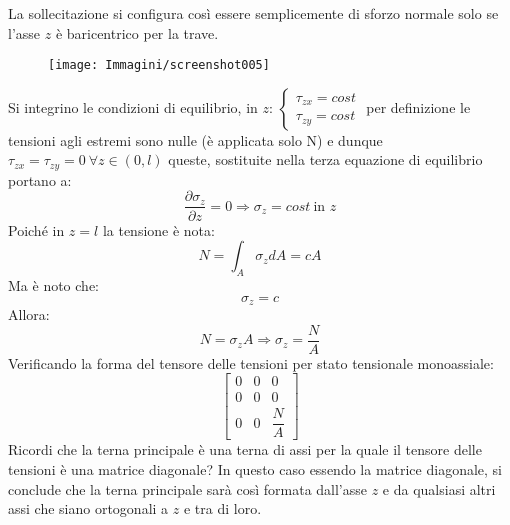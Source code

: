 \documentclass{article}
\begin{document}
\begin{adjustwidth}{2in}{}
 	La sollecitazione si configura così essere semplicemente di sforzo normale solo se l’asse $ z $ è baricentrico per la trave.
 	\begin{figure}[H]
 		\centering
 		\texttt{[image: Immagini/screenshot005]}
 		\label{fig:screenshot005}
 	\end{figure}	
 	Si integrino le condizioni di equilibrio, in $z$: $\begin{cases}
 		\tau_{zx} = cost \\
 		\tau_{zy} = cost 
 	\end{cases}$ \newline per definizione le tensioni agli estremi sono nulle (è applicata solo N) e dunque \newline $\tau_{zx} = \tau_{zy} = 0 ~ \forall z  \in  (0,l)$ queste, sostituite nella terza equazione di equilibrio portano a:
 \[ \dfrac{\partial\sigma_z}{\partial z} = 0 \Rightarrow \sigma_z = cost ~ \text{in $z$}\] 
 	Poiché in $z=l$ la tensione è nota:
 \[ 	N = \int_A \sigma_zdA = cA \]
	 Ma è noto che: \[ \sigma_z = c\] Allora:  \[N  = \sigma_zA \Rightarrow \sigma_z = \frac{N}{A} \] Verificando la forma del tensore delle tensioni per stato tensionale monoassiale:
 \[ \left[ \begin{array}{ccc}
 	0 & 0 & 0 \\
 	0 & 0 & 0 \\
 	0 & 0 & \dfrac{N}{A}
 \end{array}\right] \]
 	Ricordi che la terna principale è una terna di assi per la quale il tensore delle
 	tensioni è una matrice diagonale? In questo caso essendo la matrice diagonale, si conclude che la terna principale sarà così formata dall'asse $z$ e da qualsiasi altri assi che siano ortogonali a $z$ e tra di loro. \newline
 	

\end{adjustwidth}
\end{document}
